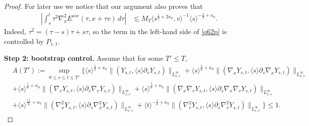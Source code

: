 \documentclass[10pt,a4paper]{amsart}
\theoremstyle{plain}
\begin{document}
\begin{proof}
	For later use we notice that our argument also proves that
	\begin{align}
		\left|\int_s^t\tau^2\nabla_x^2E^{osc}(\tau,x+\tau v)\,d\tau\right|
		&\lesssim M_T\langle s^{\frac12+2\kappa_0},v\rangle^{-1}\langle s\rangle^{-\frac13+\kappa_0}.
		\label{q62p}
	\end{align}
	Indeed, $\tau^2=(\tau-s)\tau+s\tau$, so the term in the left-hand side of \eqref{q62p} is controlled by $P_{1,1}$.
	\medskip
	
	\textbf{Step 2: bootstrap control.}
	Assume that for some $T'\le T$,
	\begin{equation}\label{n12}
		\begin{split}
			&A(T'):=	\sup_{0\leq s\leq t\leq T'}\big\{\langle s\rangle^{\frac{1}{2}+\kappa_0}\|(Y_{s,t},\langle s\rangle\partial_sY_{s,t})\|_{L^\infty_{x,v}}+\langle s\rangle^{\frac{7}{6}+\kappa_0}\|(\nabla_xY_{s,t},\langle s\rangle\partial_s\nabla_xY_{s,t})\|_{L^\infty_{x,v}}\\
			&+\langle s\rangle^{\frac{1}{6}+\kappa_0}\|(\nabla_vY_{s,t},\langle s\rangle\partial_s\nabla_vY_{s,t})\|_{L^\infty_{x,v}}	+\langle s\rangle^{\frac{5}{6}+\kappa_0}\|(\nabla_x\nabla_vY_{s,t},\langle s\rangle\partial_s\nabla_x\nabla_vY_{s,t})\|_{L^\infty_{x,v}}\\
			&+\langle s\rangle^{\frac{11}{6}+\kappa_0}\|(\nabla_x^2Y_{s,t},\langle s\rangle\partial_s\nabla_x^2Y_{s,t})\|_{L^\infty_{x,v}}+\langle t\rangle^{-\frac{1}{6}+\kappa_0}\|(\nabla_v^2Y_{s,t},\langle s\rangle\partial_s\nabla_v^2Y_{s,t})\|_{L^\infty_{x,v}}\big\}\leq 1.
		\end{split}
	\end{equation}
	

\end{proof}
\end{document}
